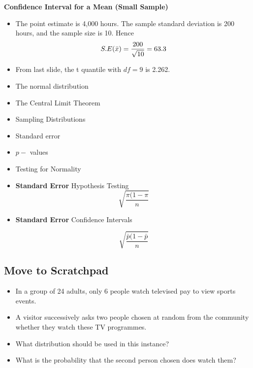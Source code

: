 \documentclass[]{report}
\begin{document}
\textbf{Confidence Interval for a Mean (Small Sample)}
\begin{itemize}
\item  The point estimate is 4,000 hours. The sample standard deviation is 200 hours, and the sample size is 10. Hence \[S.E(\bar{x} ) = { 200 \over \sqrt{10}} = 63.3\]

\item  From last slide, the t quantile with $df=9$ is 2.262.
\end{itemize}





\begin{itemize}
\item The normal distribution
\item The Central Limit Theorem
\item Sampling Distributions
\item Standard error
\item $p-$ values
\item Testing for Normality
\end{itemize}



\begin{itemize}
\item \textbf{Standard Error}
Hypothesis Testing
\[\sqrt{\frac{\pi (1- \pi}{n}}\]

\item \textbf{Standard Error}
Confidence Intervals

\[\sqrt{\frac{\bar{p} (1- \bar{p}}{n}}\]
\end{itemize}




\subsection{Move to Scratchpad}
\begin{itemize}
\item In a group of 24 adults, only 6 people watch televised pay to view
sports events. \item A visitor successively asks two people chosen at random from the
community whether they watch these TV programmes.
\item What distribution should be used in this instance? \item What is the probability
that the second person chosen does watch them?
\end{itemize}
\end{document}
